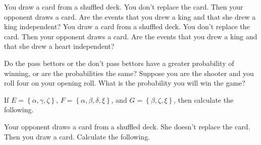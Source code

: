 \documentclass[answers,12pt]{exam}
\begin{document}
\begin{questions}
\question You draw a card from a shuffled deck. You don't replace
the card. Then your opponent draws a card. Are the events that
you drew a king and that she drew a king independent?
\question You draw a card from a shuffled deck. You don't replace
the card. Then your opponent draws a card. Are the events that
you drew a king and that she drew a heart independent?

\question Do the pass bettors or the don't pass bettors have
a greater probability of winning, or are the probabilities the same?
\question Suppose you are the shooter and you roll four on your opening
roll. What is the probability you will win the game?

\question If $E=\left\{\alpha,\gamma,\zeta\right\}$,
$F=\left\{\alpha,\beta,\delta,\xi\right\}$, and
$G=\left\{\beta,\zeta,\xi\right\}$, then calculate the following.

\question Your opponent draws a card from a shuffled deck. She doesn't
replace the card. Then you draw a card. Calculate the following.
\end{questions}
\end{document}
